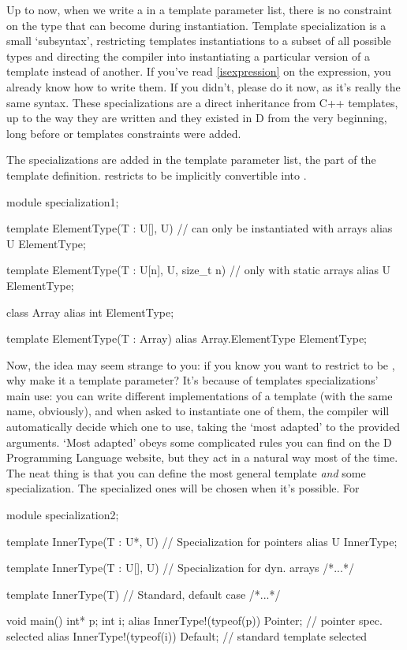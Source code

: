Up to now, when we write a  in a template parameter list, there is no constraint on the type that  can become during instantiation. Template specialization is a small `subsyntax', restricting templates instantiations to a subset of all possible types and directing the compiler into instantiating a particular version of a template instead of another. If you've read \autoref{isexpression} on the  expression, you already know how to write them. If you didn't, please do it now, as it's really the same syntax. These specializations are a direct inheritance from C++ templates, up to the way they are written and they existed in D from the very beginning, long before  or templates constraints were added. 

The specializations are added in the template parameter list, the  part of the template definition.  restricts  to be implicitly convertible into . 

\begin{dcode}
module specialization1;

template ElementType(T : U[], U) // can only be instantiated with arrays
{
    alias U ElementType;
}

template ElementType(T : U[n], U, size_t n) // only with static arrays
{
    alias U ElementType;
}

class Array { alias int ElementType;}

template ElementType(T : Array) 
{
    alias Array.ElementType ElementType;
}
\end{dcode}

Now, the idea may seem strange to you: if you know you want to restrict  to be , why make it a template parameter? It's because of templates specializations' main use: you can write different implementations of a template (with the same name, obviously), and when asked to instantiate one of them, the compiler will automatically decide which one to use, taking the `most adapted' to the provided arguments. `Most adapted' obeys some complicated rules you can find on the D Programming Language website, but they act in a natural way most of the time. The neat thing is that you can define the most general template \emph{and} some specialization. The specialized ones will be chosen when it's possible. For 

\begin{dcode}
module specialization2;

template InnerType(T : U*, U) // Specialization for pointers
{
    alias U InnerType;
}

template InnerType(T : U[], U) // Specialization for dyn. arrays
{ /*...*/ }

template InnerType(T) // Standard, default case
{ /*...*/ }

void main()
{
    int* p;
    int i; 
    alias InnerType!(typeof(p)) Pointer; // pointer spec. selected
    alias InnerType!(typeof(i)) Default; // standard template selected
}
\end{dcode}

